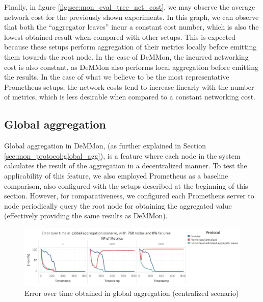 Finally, in figure \ref{fig:sec:mon_eval_tree_net_cost}, we may observe the average network cost for the previously shown experiments. In this graph, we can observe that both the ``aggregator leaves'' incur a constant cost number, which is also the lowest obtained result when compared with other setups. This is expected because these setups perform aggregation of their metrics locally before emitting them towards the root node. In the case of DeMMon, the incurred networking cost is also constant, as DeMMon also performs local aggregation before emitting the results. In the case of what we believe to be the most representative Prometheus setups, the network costs tend to increase linearly with the number of metrics, which is less desirable when compared to a constant networking cost.

\subsection{Global aggregation}

Global aggregation in DeMMon, (as further explained in Section \ref{sec:mon_protocol:global_agg}), is a feature where each node in the system calculates the result of the aggregation in a decentralized manner. To test the applicability of this feature, we also employed Prometheus as a baseline comparison, also configured with the setups described at the beginning of this section. However, for comparativeness, we configured each Prometheus server to node periodically query the root node for obtaining the aggregated value (effectively providing the same results as DeMMon).

\begin{figure}
    \centering
    \includegraphics[width=\linewidth]{Chapters/evaluation/figures/aggregation/Error_over_time_global_0_failures_centralized.jpg}
    \caption{Error over time obtained in global aggregation (centralized scenario)}
    \label{fig:sec:mon_eval_global_centralized}
\end{figure}

